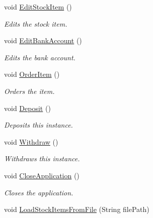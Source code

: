 \begin{DoxyCompactItemize}
void \hyperlink{class_application_logic_1_1_presenter_1_1_congregate_presenter_a7d37db88a339d87fc43733dd89ab81a2}{EditStockItem} ()
\begin{DoxyCompactList}\small\item\em Edits the stock item. \item\end{DoxyCompactList}\item 
void \hyperlink{class_application_logic_1_1_presenter_1_1_congregate_presenter_a9323005b2ae99075acf88483aff383f3}{EditBankAccount} ()
\begin{DoxyCompactList}\small\item\em Edits the bank account. \item\end{DoxyCompactList}\item 
void \hyperlink{class_application_logic_1_1_presenter_1_1_congregate_presenter_a1430360f84dca7b71d9a0e080ed99703}{OrderItem} ()
\begin{DoxyCompactList}\small\item\em Orders the item. \item\end{DoxyCompactList}\item 
void \hyperlink{class_application_logic_1_1_presenter_1_1_congregate_presenter_a4e04206afeb957490b1fa2acddfbf890}{Deposit} ()
\begin{DoxyCompactList}\small\item\em Deposits this instance. \item\end{DoxyCompactList}\item 
void \hyperlink{class_application_logic_1_1_presenter_1_1_congregate_presenter_a912cb34b6bfc35dbc016d6c1e1372b03}{Withdraw} ()
\begin{DoxyCompactList}\small\item\em Withdraws this instance. \item\end{DoxyCompactList}\item 
void \hyperlink{class_application_logic_1_1_presenter_1_1_congregate_presenter_a9c5ef28a27cbd13c11f1ee147805b9b0}{CloseApplication} ()
\begin{DoxyCompactList}\small\item\em Closes the application. \item\end{DoxyCompactList}\item 
void \hyperlink{class_application_logic_1_1_presenter_1_1_congregate_presenter_a771cb47ece00fe6223089d7f0b0cef31}{LoadStockItemsFromFile} (String filePath)

\end{DoxyCompactItemize}
